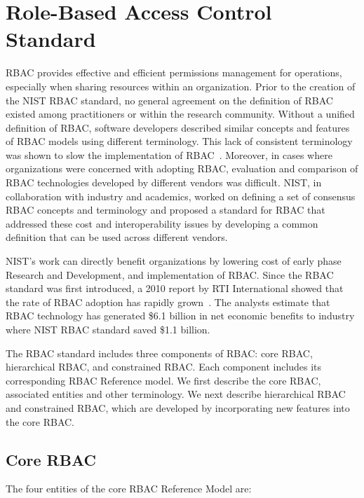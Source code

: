 \section{Role-Based Access Control Standard} \label{sec:core-rbac}

RBAC provides effective and efficient permissions management for operations, especially when sharing resources within an organization.
Prior to the creation of the NIST RBAC standard, no general agreement on the definition 
of RBAC existed among practitioners or within the research community. 
Without a unified definition of RBAC, software developers described similar concepts and features of RBAC models using different terminology. 
This lack of consistent terminology was shown to slow the implementation of RBAC~\cite{o20102010}.  
Moreover, in cases where organizations were concerned with adopting RBAC,
evaluation and comparison of RBAC technologies developed by different vendors was difficult.
NIST, in collaboration with industry and academics, worked on defining a set of consensus RBAC concepts and terminology and proposed a standard for 
RBAC that addressed these cost and interoperability issues by developing a common definition that can be used across different vendors.

NIST's work can directly benefit organizations by lowering cost of early phase Research and Development, and implementation of RBAC.
Since the RBAC standard was first introduced, a 2010 report by RTI International showed that the rate of RBAC adoption has rapidly grown~\cite{o20102010}. 
The analysts estimate that RBAC technology has generated \$6.1 billion in net economic benefits to industry where NIST RBAC standard saved \$1.1 billion.

The RBAC standard includes three components of RBAC: core RBAC, hierarchical RBAC, and constrained RBAC. Each component includes its corresponding RBAC Reference model. We first describe the core RBAC, associated entities and other terminology. We next describe hierarchical RBAC and constrained RBAC, which are developed by incorporating new features into the core RBAC. 

\subsection{Core RBAC} 

The four entities of the core RBAC Reference Model are:

